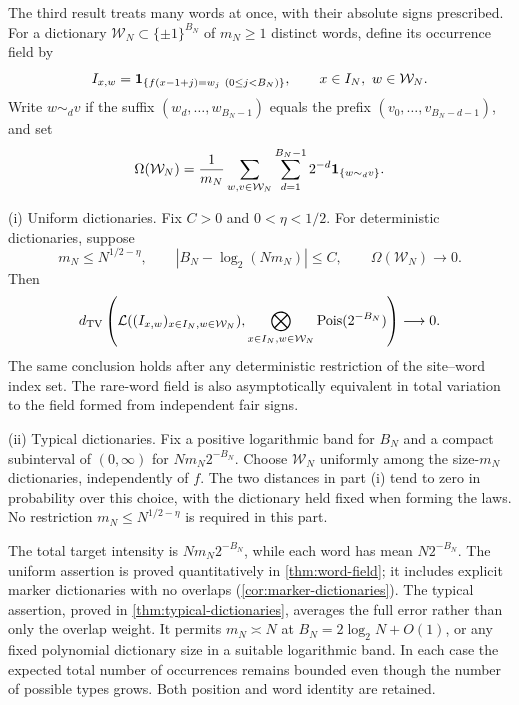 The third result treats many words at once, with their absolute signs
prescribed. For a dictionary $\mathcal W_N\subset\{\pm1\}^{B_N}$ of
$m_N\ge1$ distinct words, define its occurrence field by
\[
 I_{x,w}=\mathbf 1_{\{f(x-1+j)=w_j\ (0\le j<B_N)\}},\qquad
                     x\in I_N,\ w\in\mathcal W_N.
\]
Write $w\sim_d v$ if the suffix $(w_d,\ldots,w_{B_N-1})$ equals the
prefix $(v_0,\ldots,v_{B_N-d-1})$, and set
\begin{equation}\label{eq:intro-overlap}
 \Omega(\mathcal W_N)=\frac1{m_N}\sum_{w,v\in\mathcal W_N}
           \sum_{d=1}^{B_N-1}2^{-d}\mathbf 1_{\{w\sim_d v\}}.
\end{equation}
\begin{theorem}\label{thm:patterns-summary}
\textup{(i) Uniform dictionaries.} Fix $C>0$ and $0<\eta<1/2$.
For deterministic dictionaries, suppose
\[
 m_N\le N^{1/2-\eta},\qquad
 |B_N-\log_2(Nm_N)|\le C,\qquad
 \Omega(\mathcal W_N)\longrightarrow0.
\]
Then
\begin{equation}\label{eq:intro-word-field}
 d_{\mathrm{TV}}\left(\mathcal L((I_{x,w})_{x\in I_N,w\in\mathcal W_N}),
       \bigotimes_{x\in I_N,w\in\mathcal W_N}\operatorname{Pois}(2^{-B_N})\right)
                          \longrightarrow0.
\end{equation}
The same conclusion holds after any deterministic restriction of the
site--word index set. The rare-word field is also asymptotically equivalent
in total variation to the field formed from independent fair signs.

\smallskip\noindent
\textup{(ii) Typical dictionaries.} Fix a positive logarithmic band for
$B_N$ and a compact subinterval of $(0,\infty)$ for $Nm_N2^{-B_N}$.
Choose $\mathcal W_N$ uniformly among the size-$m_N$ dictionaries,
independently of $f$. The two distances in part \textup{(i)} tend to zero
in probability over this choice, with the dictionary held fixed when
forming the laws. No restriction $m_N\le N^{1/2-\eta}$ is required in
this part.
\end{theorem}
The total target intensity is $Nm_N2^{-B_N}$, while each word has mean
$N2^{-B_N}$. The uniform assertion is proved quantitatively in
\cref{thm:word-field}; it includes explicit marker dictionaries with no
overlaps (\cref{cor:marker-dictionaries}). The typical assertion, proved
in \cref{thm:typical-dictionaries}, averages the full error rather than
only the overlap weight. It permits $m_N\asymp N$ at
$B_N=2\log_2N+O(1)$, or any fixed polynomial dictionary size in a
suitable logarithmic band. In each case the expected total number of
occurrences remains bounded even though the number of possible types
grows. Both position and word identity are retained.

